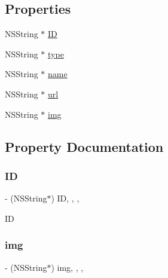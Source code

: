 \subsection*{Properties}
\begin{DoxyCompactItemize}
\item 
N\+S\+String $\ast$ \mbox{\hyperlink{interface_f_n_mine_function_model_a90599eab868889befa9e6d50094c7977}{ID}}
\item 
N\+S\+String $\ast$ \mbox{\hyperlink{interface_f_n_mine_function_model_a270352b361a8c08f455829612664b333}{type}}
\item 
N\+S\+String $\ast$ \mbox{\hyperlink{interface_f_n_mine_function_model_a7ab54265aeddd07599e6d7640508921a}{name}}
\item 
N\+S\+String $\ast$ \mbox{\hyperlink{interface_f_n_mine_function_model_a520d0ec969da6d01f0d89d8340fb9538}{url}}
\item 
N\+S\+String $\ast$ \mbox{\hyperlink{interface_f_n_mine_function_model_a76ee1bec6209b847e5a9b53d3d3456c4}{img}}
\end{DoxyCompactItemize}


\subsection{Property Documentation}
\mbox{\label{interface_f_n_mine_function_model_a90599eab868889befa9e6d50094c7977}} 
\subsubsection{\texorpdfstring{ID}{ID}}
{\footnotesize\ttfamily -\/ (N\+S\+String$\ast$) ID\hspace{0.3cm}{\ttfamily [read]}, {\ttfamily [write]}, {\ttfamily [nonatomic]}, {\ttfamily [copy]}}

ID \mbox{\label{interface_f_n_mine_function_model_a76ee1bec6209b847e5a9b53d3d3456c4}} 
\subsubsection{\texorpdfstring{img}{img}}
{\footnotesize\ttfamily -\/ (N\+S\+String$\ast$) img\hspace{0.3cm}{\ttfamily [read]}, {\ttfamily [write]}, {\ttfamily [nonatomic]}, {\ttfamily [copy]}}


